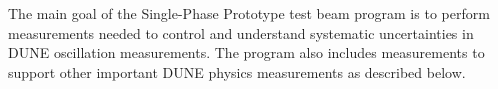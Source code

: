 The main goal of the Single-Phase Prototype test beam program is to perform measurements 
needed to control and understand systematic uncertainties in DUNE oscillation measurements.
The program also includes measurements to support other important DUNE physics measurements as described below.
%



